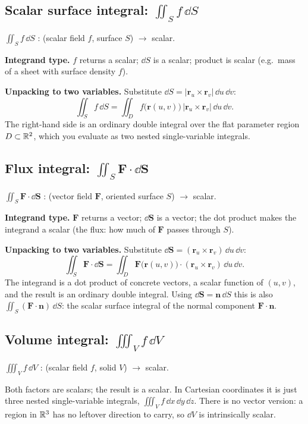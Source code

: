 \documentclass{essay}
\newcommand{\F}{\mathbf{F}}
\newcommand{\rr}{\mathbf{r}}
\newcommand{\nn}{\mathbf{n}}
\begin{document}
\subsection{Scalar surface integral: $\iint_S f\,\dd S$}

\begin{signature}
$\displaystyle \iint_S f\,\dd S$ \;:\; (scalar field $f$, surface $S$) $\to$ scalar.
\end{signature}

\textbf{Integrand type.} $f$ returns a scalar; $\dd S$ is a scalar; product is
scalar (e.g.\ mass of a sheet with surface density $f$).

\textbf{Unpacking to two variables.} Substitute
$\dd S = \lvert\rr_u\times\rr_v\rvert\,\dd u\,\dd v$:
\[
\iint_S f\,\dd S
= \iint_D f\bigl(\rr(u,v)\bigr)\,\lvert\rr_u\times\rr_v\rvert\,\dd u\,\dd v .
\]
The right-hand side is an ordinary double integral over the flat parameter region
$D\subset\mathbb{R}^2$, which you evaluate as two nested single-variable integrals.

\subsection{Flux integral: $\iint_S \F\cdot\dd\mathbf{S}$}

\begin{signature}
$\displaystyle \iint_S \F\cdot\dd\mathbf{S}$ \;:\; (vector field $\F$, oriented
surface $S$) $\to$ scalar.
\end{signature}

\textbf{Integrand type.} $\F$ returns a vector; $\dd\mathbf{S}$ is a vector; the dot
product makes the integrand a scalar (the flux: how much of $\F$ passes through $S$).

\textbf{Unpacking to two variables.} Substitute
$\dd\mathbf{S}=(\rr_u\times\rr_v)\,\dd u\,\dd v$:
\[
\iint_S \F\cdot\dd\mathbf{S}
= \iint_D \F\bigl(\rr(u,v)\bigr)\cdot(\rr_u\times\rr_v)\,\dd u\,\dd v .
\]
The integrand is a dot product of concrete vectors, a scalar function of $(u,v)$, and
the result is an ordinary double integral. Using $\dd\mathbf{S}=\nn\,\dd S$ this is
also $\iint_S(\F\cdot\nn)\,\dd S$: the scalar surface integral of the normal
component $\F\cdot\nn$.

\subsection{Volume integral: $\iiint_V f\,\dd V$}

\begin{signature}
$\displaystyle \iiint_V f\,\dd V$ \;:\; (scalar field $f$, solid $V$) $\to$ scalar.
\end{signature}
Both factors are scalars; the result is a scalar. In Cartesian coordinates it is just
three nested single-variable integrals,
$\iiint_V f\,\dd x\,\dd y\,\dd z$. There is no vector version: a region in $\mathbb{R}^3$ has
no leftover direction to carry, so $\dd V$ is intrinsically scalar.
\end{document}
